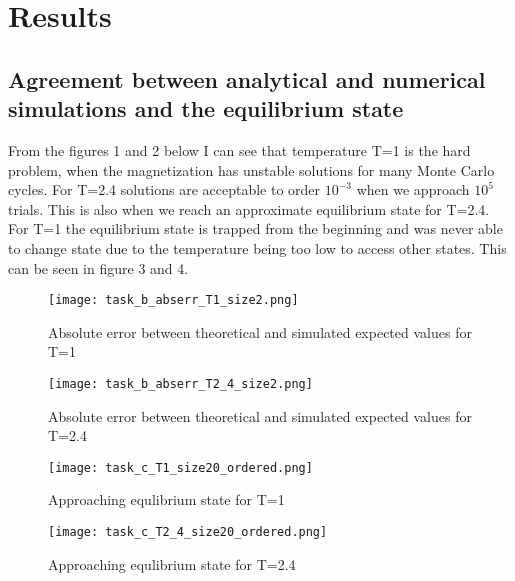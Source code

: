 \section{Results}

\subsection{Agreement between analytical and numerical simulations and the equilibrium state}

From the figures 1 and 2 below I can see that temperature T=1 is the hard problem, when the magnetization has unstable solutions for many Monte Carlo cycles. For T=2.4 solutions are acceptable to order $10^{-3}$ when we approach $10^5$ trials. This is also when we reach an approximate equilibrium state for T=2.4. For T=1 the equilibrium state is trapped from the beginning and was never able to change state due to the temperature being too low to access other states. This can be seen in figure 3 and 4.

\FloatBarrier
\begin{figure}[!ht]
\centering
\FloatBarrier
\texttt{[image: task\_b\_abserr\_T1\_size2.png]}

\caption{Absolute error between theoretical and simulated expected values for T=1}
\label{fig:Earth_orbit_sun_Forward_Euler_k_4}
\end{figure}
\FloatBarrier


\FloatBarrier
\begin{figure}[!ht]
\centering
\FloatBarrier
\texttt{[image: task\_b\_abserr\_T2\_4\_size2.png]}

\caption{Absolute error between theoretical and simulated expected values for T=2.4}
\label{fig:Earth_orbit_sun_Forward_Euler_k_2}
\end{figure}
\FloatBarrier



\FloatBarrier
\begin{figure}[!ht]
\centering
\FloatBarrier
\texttt{[image: task\_c\_T1\_size20\_ordered.png]}

\caption{Approaching equlibrium state for T=1}
\label{fig:Earth_orbit_sun_Forward_Euler_k_2}
\end{figure}
\FloatBarrier


\FloatBarrier
\begin{figure}[!ht]
\centering
\FloatBarrier
\texttt{[image: task\_c\_T2\_4\_size20\_ordered.png]}

\caption{Approaching equlibrium state for T=2.4}
\label{fig:Earth_orbit_sun_Forward_Euler_k_2}
\end{figure}
\FloatBarrier

